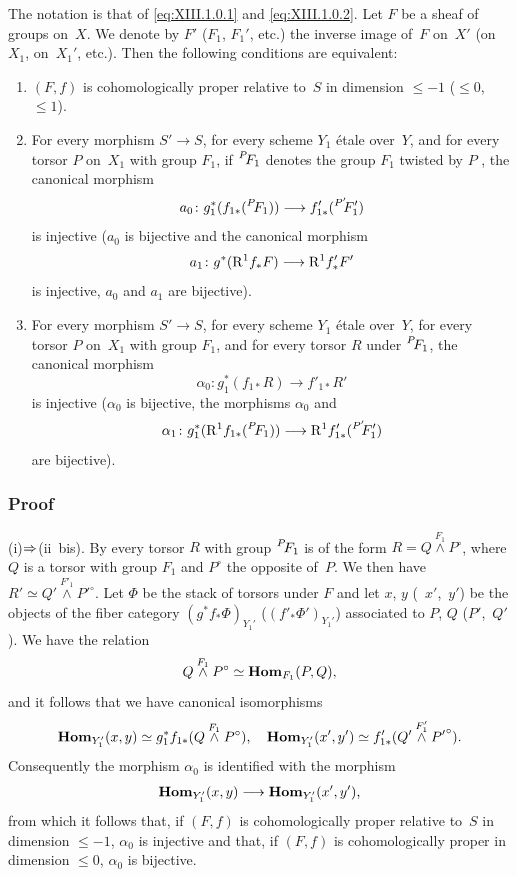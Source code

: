 \begin{subproposition}
\label{XIII.1.3.1}
The notation is that of \eqref{eq:XIII.1.0.1} and
\eqref{eq:XIII.1.0.2}. Let $F$ be a sheaf of groups on~$X$. We
denote by $F'$ (\resp $F_1$, \resp $F_1'$, etc.) the inverse
image of~$F$ on~$X'$ (\resp on~$X_1$, \resp on~$X_1'$,
etc.). Then the following conditions are equivalent:
\begin{enumerate}
\item[(i)] $(F,f)$ is cohomologically proper relative to~$S$
in dimension $\leqslant -1$ (\resp $\leqslant 0$, \resp $\leqslant
1$).
\item[(ii)] For every morphism $S' \to S$, for every scheme $Y_1$
\'etale over~$Y$, and for every torsor $P$ on~$X_1$ with
group $F_1$, if $\leftexp{P\mkern-4mu}{F}_1$ denotes the group $F_1$
twisted by $P$ \textup{\cite[II 4.1.2.3]{XIII.1}}, the canonical morphism
$$
a_0 \colon g_1^*(f_{1 *}(\leftexp{P\mkern-4mu}{F}_1)) \to f'_{1
*}(\leftexp{P'\mkern-6mu}{F}'_1)
$$
is injective (\resp $a_0$ is bijective and the canonical morphism
$$
a_1 \colon g^*(\R^1 f_* F) \to \R^1 f'_* F'
$$
is
injective, \resp $a_0$ and $a_1$ are bijective).
\item[(ii~bis)] For every morphism $S' \to S$, for every scheme
$Y_1$ \'etale over~$Y$, for every torsor $P$ on~$X_1$ with
group $F_1$, and for every torsor $R$ under $\leftexp{P\mkern-4mu}{F}_1$, the
canonical morphism
$$
\alpha_0 \colon g_1^*(f_{1 *}R) \to f'_{1 *} R'
$$
is injective (\resp $\alpha_0$ is bijective, \resp the morphisms
$\alpha_0$ and
$$
\alpha_1 \colon g_1^*(\R^1 f_{1 *}(\leftexp{P\mkern-4mu}{F}_1)) \to \R^1
f'_{1 *}(\leftexp{P'\mkern-6mu}{F}'_1)
$$
are bijective).
\end{enumerate}
\end{subproposition}

\subsubsection*{Proof}
(i)$\To$(ii~bis). By \cite[II 4.2.5]{XIII.1} every torsor $R$
with group $\leftexp{P\mkern-4mu}{F}_1$ is of the form $R = Q
\overset{F_1}{\wedge} P^\circ$, where $Q$ is a torsor with group
$F_1$ and $P^\circ$ the opposite of~$P$. We then have $R' \simeq Q'
\overset{F'_1}{\wedge} {P'}^\circ$. Let $\Phi$ be the stack of torsors
under $F$ and let $x$, $y$ (\resp~$x'$,~$y'$) be the objects of the
fiber category $(g^* f_* \Phi)_{Y_1'}$ (\resp $(f'_*
\Phi')_{Y_1'}$) associated to $P$, $Q$ (\resp $P'$,~$Q'$). We have
the relation
$$
Q\overset{F_1}{\wedge} P^\circ \simeq \operatorname{\mathbf{Hom}}_{F_1}(P,Q) \text{,}
$$
and it follows that we have canonical isomorphisms
$$
\operatorname{\mathbf{Hom}}_{Y'_1}(x,y) \simeq g_1^* f_{1 *}(Q
\overset{F_1}{\wedge} P^\circ) \text{,}\quad \operatorname{\mathbf{Hom}}_{Y_1'}(x',y')
\simeq f'_{1 *}(Q' \overset{F'_1}{\wedge}{P'}^\circ)\text{.}
$$
Consequently the morphism $\alpha_0$ is identified with the morphism
$$
\SheafHom_{Y'_1}(x,y) \to \SheafHom_{Y'_1}(x',y') \text{,}
$$
from which it follows that, if $(F,f)$ is cohomologically proper
relative to~$S$ in dimension $\leqslant -1$, $\alpha_0$ is
injective and that, if $(F,f)$ is cohomologically proper in dimension
$\leqslant 0$, $\alpha_0$ is bijective.

